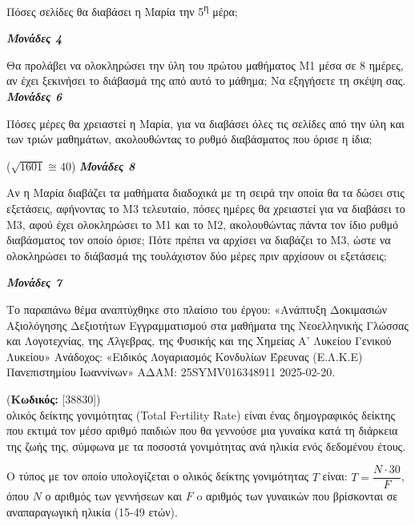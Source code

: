 \documentclass[11pt,a4paper,twoside]{book}
\newcounter{askhsh}[chapter]
\renewcommand{\theaskhsh}{
	\bf{\titlefont{\Large{\thechapter}}.\arabic{askhsh}}
}
\newcommand{\Askhsh}[2]{\refstepcounter{askhsh}{\titlefont{Άσκηση\theaskhsh} - \textcolor{maincolor}{ΘΕΜΑ #2}} (\small{\textbf{Κωδικός:} #1})\\}{}
\newcommand{\monades}[1]{
\hspace*{\fill}
\textbf{\textit{\textcolor{maincolor}{Μονάδες #1}}}}
\begin{document}
\begin{alist}
\item Πόσες σελίδες θα διαβάσει η Μαρία την 5\textsuperscript{η} μέρα;
\monades{4}
\item Θα προλάβει να ολοκληρώσει την ύλη του πρώτου μαθήματος Μ1 μέσα σε 8 ημέρες, αν έχει ξεκινήσει το διάβασμά της από αυτό το μάθημα; Να εξηγήσετε τη σκέψη σας.\monades{6}
\item Πόσες μέρες θα χρειαστεί η Μαρία, για να διαβάσει όλες τις σελίδες από την ύλη και των τριών μαθημάτων, ακολουθώντας το ρυθμό διαβάσματος που όρισε η ίδια;

($\sqrt{1601} \cong 40$)\monades{8}
\item Αν η Μαρία διαβάζει τα μαθήματα διαδοχικά με τη σειρά την οποία θα τα δώσει στις εξετάσεις, αφήνοντας το Μ3 τελευταίο, πόσες ημέρες θα χρειαστεί για να διαβάσει το Μ3, αφού έχει ολοκληρώσει το Μ1 και το Μ2, ακολουθώντας πάντα τον ίδιο ρυθμό διαβάσματος τον οποίο όρισε; Πότε πρέπει να αρχίσει να διαβάζει το Μ3, ώστε να ολοκληρώσει το διάβασμά της τουλάχιστον δύο μέρες πριν αρχίσουν οι εξετάσεις;
\monades{7}

{\footnotesize Το παραπάνω θέμα αναπτύχθηκε στο πλαίσιο του έργου: «Ανάπτυξη Δοκιμασιών Αξιολόγησης Δεξιοτήτων Εγγραμματισμού στα μαθήματα της Νεοελληνικής Γλώσσας και Λογοτεχνίας, της Άλγεβρας, της Φυσικής και της Χημείας Α' Λυκείου Γενικού Λυκείου» Ανάδοχος: «Ειδικός Λογαριασμός Κονδυλίων Έρευνας (Ε.Λ.Κ.Ε) Πανεπιστημίου Ιωαννίνων» ΑΔΑΜ: 25SYMV016348911 2025-02-20.}
\end{alist}

\vspace{4mm}

\Askhsh{[38830]}
Ο ολικός δείκτης γονιμότητας (Total Fertility Rate) είναι ένας δημογραφικός δείκτης που εκτιμά τον μέσο αριθμό παιδιών που θα γεννούσε μια γυναίκα κατά τη διάρκεια της ζωής της, σύμφωνα με τα ποσοστά γονιμότητας ανά ηλικία ενός δεδομένου έτους.

Ο τύπος με τον οποίο υπολογίζεται ο ολικός δείκτης γονιμότητας $T$ είναι: $T = \dfrac{Ν \cdot 30}{F}$, όπου $N$ ο αριθμός των γεννήσεων και $F$ o αριθμός των γυναικών που βρίσκονται σε αναπαραγωγική ηλικία (15-49 ετών).
\end{document}
